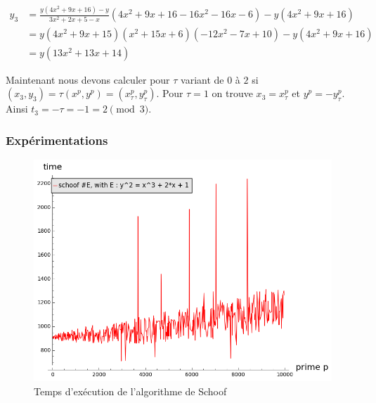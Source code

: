 \documentclass[12pt]{article}
\begin{document}
\begin{align*}
y_3 &= \frac{y(4x^2+9x+16) - y}{3x^2 +2x +5 - x} (4x^2+9x+16 -  16x^2 - 16x - 6) - y(4x^2+9x+16) \\
	&= y(4x^2+9x+15)(x^2+15x+6)( -12x^2 - 7x +10 ) - y(4x^2+9x+16)\\
	&= y(13x^2 + 13x + 14)
\end{align*}

Maintenant nous devons calculer pour $\tau$ variant de $0$ à $2$ si $(x_3, y_3) = \tau (x^p, y^p)=(x_{\tau}^p, y_{\tau}^p)$. Pour $\tau = 1$ on trouve $x_3 = x_{\tau}^p$ et $y^p= - y_{\tau}^p$. Ainsi $t_3 = -\tau = -1 = 2 \pmod 3$. 

\newpage
\subsubsection{Expérimentations}

\begin{figure}[h!]
\includegraphics[scale=0.6]{pictures/schoof_cputime.png} 
\caption{Temps d'exécution de l'algorithme de Schoof}
\end{figure}
\end{document}
